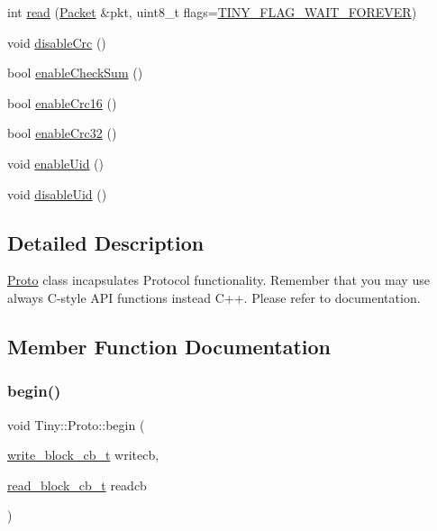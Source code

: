 \begin{DoxyCompactItemize}
\item 
int \hyperlink{classTiny_1_1Proto_aedef629f8b8968db7c8693bb45039651}{read} (\hyperlink{classTiny_1_1Packet}{Packet} \&pkt, uint8\+\_\+t flags=\hyperlink{group__FLAGS__GROUP_ga3a34267804581c5709d03f52d232b307}{T\+I\+N\+Y\+\_\+\+F\+L\+A\+G\+\_\+\+W\+A\+I\+T\+\_\+\+F\+O\+R\+E\+V\+ER})
\item 
void \hyperlink{classTiny_1_1Proto_a8992983d7ada115b0aa24db41594947c}{disable\+Crc} ()
\item 
bool \hyperlink{classTiny_1_1Proto_abb6cbae9a9944dc9ae0d756554f65a52}{enable\+Check\+Sum} ()
\item 
bool \hyperlink{classTiny_1_1Proto_a794afcac2ca15544247c34b059bc1289}{enable\+Crc16} ()
\item 
bool \hyperlink{classTiny_1_1Proto_a2ef1c80490d9343b896180ab8b8a6f77}{enable\+Crc32} ()
\item 
void \hyperlink{classTiny_1_1Proto_a9fdd64b8296e27f3205cd0d3ea685eac}{enable\+Uid} ()
\item 
void \hyperlink{classTiny_1_1Proto_aff9f3c59f58a8ca527ad0254ab806c5c}{disable\+Uid} ()
\end{DoxyCompactItemize}


\subsection{Detailed Description}
\hyperlink{classTiny_1_1Proto}{Proto} class incapsulates Protocol functionality. Remember that you may use always C-\/style A\+PI functions instead C++. Please refer to documentation. 

\subsection{Member Function Documentation}
\mbox{\label{classTiny_1_1Proto_a6f5f4ebec42dc6e679c25e79284d7705}} 
\subsubsection{\texorpdfstring{begin()}{begin()}}
{\footnotesize\ttfamily void Tiny\+::\+Proto\+::begin (\begin{DoxyParamCaption}\item[{\hyperlink{tiny__proto__types_8h_a7f69e669de5baa69a43ee5cb439a7496}{write\+\_\+block\+\_\+cb\+\_\+t}}]{writecb,  }\item[{\hyperlink{tiny__proto__types_8h_ae3d867e030f59de94508902f2b84a7ec}{read\+\_\+block\+\_\+cb\+\_\+t}}]{readcb }\end{DoxyParamCaption})}


